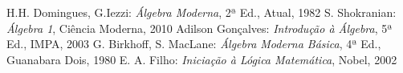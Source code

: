 \cleardoublepage
{}
{}
\renewcommand{\bibname}{Bibliografia}

\begin{thebibliography}{99}
 H.H. Domingues, G.Iezzi: \textit{Álgebra Moderna}, 2ª Ed., Atual, 1982
 S. Shokranian: \textit{Álgebra 1}, Ciência Moderna, 2010
 Adilson Gonçalves: \textit{Introdução à Álgebra}, 5ª Ed., IMPA, 2003
 G. Birkhoff, S. MacLane: \textit{Álgebra Moderna Básica}, 4ª Ed., Guanabara Dois, 1980
 E. A. Filho: \textit{Iniciação à Lógica Matemática}, Nobel, 2002
\end{thebibliography}